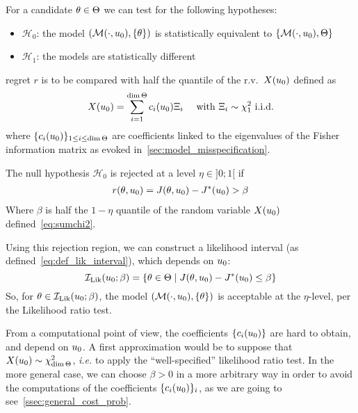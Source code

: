 \documentclass[../../Main_ManuscritThese.tex]{subfiles}
\begin{document}
For a candidate $\theta\in \Theta$ we can test for the following hypotheses:
 \begin{itemize}
 \item $\mathcal{H}_0$: the model $\left(\mathcal{M}(\cdot, u_0), \{\theta\}\right)$ is statistically equivalent to $\left\{\mathcal{M}(\cdot, u_0), \Theta\right\}$
 \item $\mathcal{H}_1$: the models are statistically different
 \end{itemize}
  regret $r$ is to be compared with half the quantile of the r.v.\ $X(u_0)$ defined as
  \begin{equation}
    \label{eq:sumchi2}
X(u_0)=\sum_{i=1}^{\dim \Theta} c_i(u_0) \Xi_i \quad \text{ with } \Xi_i \sim \chi^2_1 \text{ i.i.d.}
\end{equation}
 where $\{c_i(u_0)\}_{1\leq i \leq \dim \Theta}$ are coefficients linked to the eigenvalues of the Fisher information matrix as evoked in~\cref{sec:model_misspecification}.
 
The null hypothesis $\mathcal{H}_0$ is rejected at a level $\eta \in ]0;1[$ if
  \begin{align}
  r(\theta, u_0)=J(\theta, u_0) - J^*(u_0) > \beta 
  \end{align}
  Where $\beta$ is half the $1-\eta$ quantile of the random variable $X(u_0)$ defined~\eqref{eq:sumchi2}.
  
 Using this rejection region, we can construct a likelihood interval (as defined~\cref{eq:def_lik_interval}), which depends on $u_0$:
  \begin{equation}
    \label{eq:lik_interval_add}
    \mathcal{I}_{\mathrm{Lik}}(u_0; \beta) = \left\{\theta\in \Theta \mid  J(\theta, u_0) - J^*(u_0) \leq \beta\right\}
  \end{equation}
  So, for $\theta \in \mathcal{I}_{\mathrm{Lik}}(u_0;\beta)$, the model $(\mathcal{M}(\cdot, u_0),\{\theta\})$ is acceptable at the $\eta$-level, per the Likelihood ratio test.

  
  From a computational point of view, the coefficients $\{c_i(u_0)\}$ are hard to obtain, and depend on $u_0$. A first approximation would be to suppose that $X(u_0) \sim \chi^2_{\dim \Theta}$, \emph{i.e.} to apply the ``well-specified'' likelihood ratio test. In the more general case, we can choose $\beta>0$ in a more arbitrary way in order to avoid the computations of the coefficients $\{c_i(u_0)\}_i$, as we are going to see~\cref{ssec:general_cost_prob}.
  
  
\end{document}
